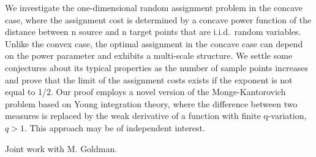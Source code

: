 \mypage
{}
\begin{myabstract}
We investigate the one-dimensional random assignment problem in the
concave case, where the assignment cost is determined by a concave power
function of the distance between n source and n target points that are
i.i.d.\ random variables. Unlike the convex case, the optimal assignment
in the concave case can depend on the power parameter and exhibits a
multi-scale structure. We settle some conjectures about its typical
properties as the number of sample points increases and prove that the
limit of the assignment costs exists if the exponent is not equal to
1/2. Our proof employs a novel version of the Monge-Kantorovich problem
based on Young integration theory, where the difference between two
measures is replaced by the weak derivative of a function with finite
q-variation, \protect $q>1$. This approach may be of independent interest. 

Joint
work with M. Goldman.
\end{myabstract}
